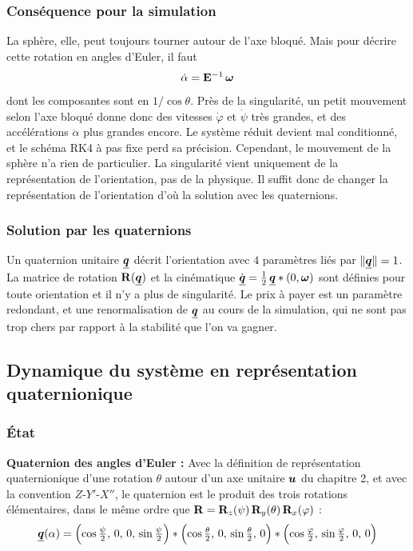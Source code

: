 \subsubsection{Conséquence pour la simulation}

La sphère, elle, peut toujours tourner autour de l'axe bloqué. Mais
pour décrire cette rotation en angles d'Euler, il faut
\[
    \dot\alpha = \mathbf{E}^{-1}\,\bm{\omega}
\]
dont les composantes sont en $1/\cos\theta$. Près de la singularité,
un petit mouvement selon l'axe bloqué donne donc des vitesses
$\dot\varphi$ et $\dot\psi$ très grandes, et des accélérations
$\ddot\alpha$ plus grandes encore. Le système réduit devient mal
conditionné, et le schéma RK4 à pas fixe perd sa précision. Cependant, le mouvement de la sphère n'a rien de particulier. La singularité vient uniquement de la représentation de l'orientation, pas de la physique. Il suffit donc de changer la représentation de l'orientation d'où la solution avec les quaternions.

\subsubsection{Solution par les quaternions}

Un quaternion unitaire $\underline{\bm{q}}$ décrit l'orientation avec $4$
paramètres liés par $\|\underline{\bm{q}}\| = 1$. La matrice de rotation
$\mathbf{R}(\underline{\bm{q}})$ et la cinématique $\dot{\underline{\bm{q}}} = \tfrac12\,\underline{\bm{q}}\ast(0,\bm{\omega})$ sont définies pour toute orientation et il n'y a plus de
singularité. Le prix à payer est un paramètre redondant, et une
renormalisation de $\underline{\bm{q}}$ au cours de la simulation, qui ne sont pas trop chers par rapport à la stabilité que l'on va gagner.

\subsection{Dynamique du système en représentation quaternionique}

\subsubsection{État}

\textbf{Quaternion des angles d'Euler : } Avec la définition de représentation quaternionique d'une rotation $\theta$ autour d'un axe unitaire $\bm{u}$ du chapitre 2, et avec la convention
$Z$-$Y'$-$X''$, le quaternion est
le produit des trois rotations élémentaires, dans le même ordre que
$\mathbf{R} = \mathbf{R}_z(\psi)\,\mathbf{R}_y(\theta)\,\mathbf{R}_x(\varphi)$ :
\[
    \underline{\bm{q}}(\alpha)
    = \Bigl(\cos\tfrac{\psi}{2},\, 0,\, 0,\, \sin\tfrac{\psi}{2}\Bigr)
    \ast\Bigl(\cos\tfrac{\theta}{2},\, 0,\, \sin\tfrac{\theta}{2},\, 0\Bigr)
    \ast\Bigl(\cos\tfrac{\varphi}{2},\, \sin\tfrac{\varphi}{2},\, 0,\, 0\Bigr)
\]

